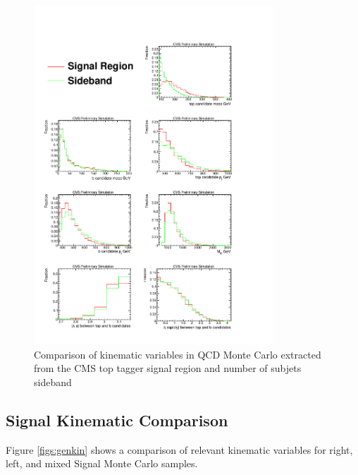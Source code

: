 \begin{figure}[Htcb]
\centering
\includegraphics[width=0.8\textwidth]{AN-13-004/figs/SBtoSR.pdf}
\caption{Comparison of kinematic variables in QCD Monte Carlo extracted from the CMS top tagger signal region and number of subjets sideband}
\label{figs:SBtoSR}
\end{figure}



\subsection{Signal Kinematic Comparison}
\label{sec:SigKinGen}
Figure \ref{figs:genkin} shows a comparison of relevant kinematic variables for right, left, and mixed Signal Monte Carlo samples.


